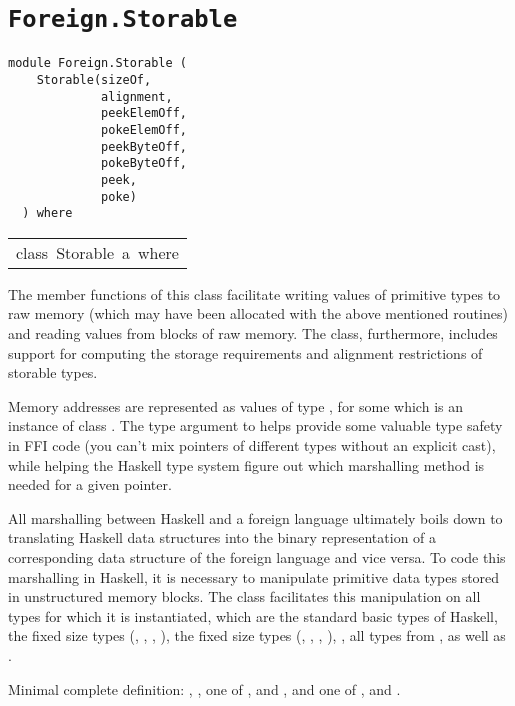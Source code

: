 \chapter{\texttt{Foreign.Storable}}
\label{module:Foreign.Storable}
\haddockbeginheader
{\haddockverb\begin{verbatim}
module Foreign.Storable (
    Storable(sizeOf,
             alignment,
             peekElemOff,
             pokeElemOff,
             peekByteOff,
             pokeByteOff,
             peek,
             poke)
  ) where\end{verbatim}}
\haddockendheader

\begin{haddockdesc}
\item[\begin{tabular}{@{}l}
class\ Storable\ a\ where
\end{tabular}]\haddockbegindoc
The member functions of this class facilitate writing values of
primitive types to raw memory (which may have been allocated with the
above mentioned routines) and reading values from blocks of raw
memory.  The class, furthermore, includes support for computing the
storage requirements and alignment restrictions of storable types.
\par
Memory addresses are represented as values of type , for some
 which is an instance of class .  The type argument to
 helps provide some valuable type safety in FFI code (you can't
mix pointers of different types without an explicit cast), while
helping the Haskell type system figure out which marshalling method is
needed for a given pointer.
\par
All marshalling between Haskell and a foreign language ultimately
boils down to translating Haskell data structures into the binary
representation of a corresponding data structure of the foreign
language and vice versa.  To code this marshalling in Haskell, it is
necessary to manipulate primitive data types stored in unstructured
memory blocks.  The class  facilitates this manipulation on
all types for which it is instantiated, which are the standard basic
types of Haskell, the fixed size  types (, ,
, ), the fixed size  types (, ,
, ), , all types from ,
as well as .
\par
Minimal complete definition: , , one of ,
 and , and one of ,  and
.
\par


\end{haddockdesc}
